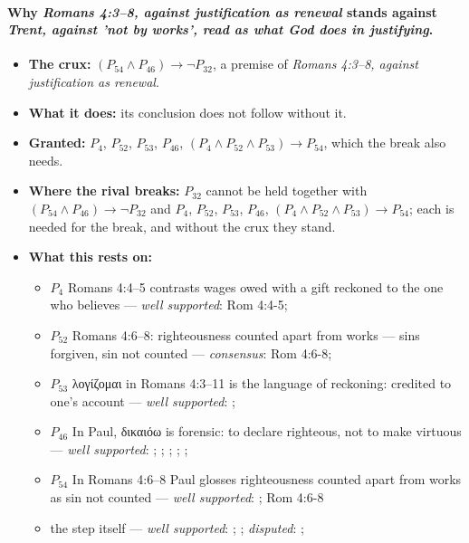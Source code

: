 \documentclass[11pt]{article}
\begin{document}
\paragraph{Why \emph{Romans 4:3–8, against justification as renewal} stands against \emph{Trent, against 'not by works', read as what God does in justifying}.}
\begin{itemize}
\item \textbf{The crux:} \((P_{54} \land P_{46}) \rightarrow \lnot P_{32}\), a premise of \emph{Romans 4:3–8, against justification as renewal}.
\item \textbf{What it does:} its conclusion does not follow without it.
\item \textbf{Granted:} \(P_{4}\), \(P_{52}\), \(P_{53}\), \(P_{46}\), \((P_{4} \land P_{52} \land P_{53}) \rightarrow P_{54}\), which the break also needs.
\item \textbf{Where the rival breaks:} \(P_{32}\) cannot be held together with \((P_{54} \land P_{46}) \rightarrow \lnot P_{32}\) and \(P_{4}\), \(P_{52}\), \(P_{53}\), \(P_{46}\), \((P_{4} \land P_{52} \land P_{53}) \rightarrow P_{54}\); each is needed for the break, and without the crux they stand.
\item \textbf{What this rests on:}
\begin{itemize}
\item \(P_{4}\) Romans 4:4–5 contrasts wages owed with a gift reckoned to the one who believes --- \emph{well supported}: Rom 4:4-5; \cite[III.xi.18]{calvin-institutes-1960}
\item \(P_{52}\) Romans 4:6–8: righteousness counted apart from works — sins forgiven, sin not counted --- \emph{consensus}: Rom 4:6-8; \cite[ad loc. Rom 4:6]{moo-romans-1996}
\item \(P_{53}\) λογίζομαι in Romans 4:3–11 is the language of reckoning: credited to one's account --- \emph{well supported}: \cite[s.v. λογίζομαι]{bauer-danker-lexicon-2000}; \cite[ad loc. Rom 4:3]{moo-romans-1996}
\item \(P_{46}\) In Paul, δικαιόω is forensic: to declare righteous, not to make virtuous --- \emph{well supported}: \cite[s.v. δικαιόω]{bauer-danker-lexicon-2000}; \cite{morris-apostolic-preaching-1965}; \cite[p. 80]{moo-romans-1996}; \cite{irons-righteousness-of-god-2015}; \cite{wright-justification-2009}; \cite[ad loc. Rom 3:24]{fitzmyer-romans-1993}
\item \(P_{54}\) In Romans 4:6–8 Paul glosses righteousness counted apart from works as sin not counted --- \emph{well supported}: \cite[ad loc. Rom 4:6]{moo-romans-1996}; Rom 4:6-8
\item the step itself --- \emph{well supported}: \cite[ad loc. Rom 4:6]{moo-romans-1996}; \cite[s.v. λογίζομαι]{bauer-danker-lexicon-2000}; \emph{disputed}: \cite[ad loc. Rom 4:5]{moo-romans-1996}; \cite[XI.1]{westminster-confession-1647}
\end{itemize}
\end{itemize}
\end{document}
